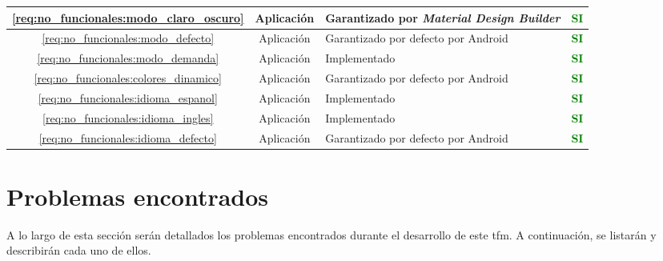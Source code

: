 \begin{xltabular}{\textwidth}{|c|c|X|c|}
        \hline
        \ref{req:no_funcionales:modo_claro_oscuro} & Aplicación & Garantizado por \textit{Material Design Builder} \cite{material_design_material_nodate-1} & \textcolor{green}{\textbf{SI}} \\
        \hline
        \ref{req:no_funcionales:modo_defecto} & Aplicación & Garantizado por defecto por Android & \textcolor{green}{\textbf{SI}} \\
        \hline
        \ref{req:no_funcionales:modo_demanda} & Aplicación & Implementado & \textcolor{green}{\textbf{SI}} \\
        \hline
        \ref{req:no_funcionales:colores_dinamico} & Aplicación & Garantizado por defecto por Android & \textcolor{green}{\textbf{SI}} \\
        \hline
        \ref{req:no_funcionales:idioma_espanol} & Aplicación & Implementado & \textcolor{green}{\textbf{SI}} \\
        \hline
        \ref{req:no_funcionales:idioma_ingles} & Aplicación & Implementado & \textcolor{green}{\textbf{SI}} \\
        \hline
        \ref{req:no_funcionales:idioma_defecto} & Aplicación & Garantizado por defecto por Android & \textcolor{green}{\textbf{SI}} \\
        \hline
    \end{xltabular}

\section{Problemas encontrados}
    \label{section:problemas}

    A lo largo de esta sección serán detallados los problemas encontrados durante el desarrollo de este \gls{tfm}. A continuación, se listarán y describirán cada uno de ellos.
    
